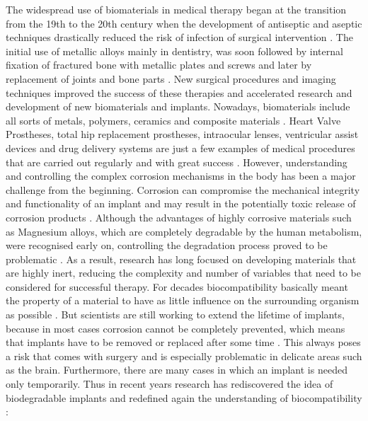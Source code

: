 The widespread use of biomaterials in medical therapy began at the transition from the 19th to the 20th century when the development of antiseptic and aseptic techniques drastically reduced the risk of infection of surgical intervention \supercite{hernigou_history_2017,balamurugan_corrosion_2008,gilbert_medical_2012}. The initial use of metallic alloys mainly in dentistry, was soon followed by internal fixation of fractured bone with metallic plates and screws \supercite{hernigou_history2_2017} and later by replacement of joints and bone parts \supercite{ratner_introduction_1997,fernandez_de_grado_bone_2018}. New surgical procedures and imaging techniques improved the success of these therapies and accelerated research and development of new biomaterials and implants. Nowadays, biomaterials include all sorts of metals, polymers, ceramics and composite materials \supercite{park_biomaterials_2007}. Heart Valve Prostheses, total hip replacement prostheses, intraocular lenses, ventricular assist devices and drug delivery systems are just a few examples of medical procedures that are carried out regularly and with great success \supercite{ratner_introduction_1997,bharadwaj_overview_2021}. However, understanding and controlling the complex corrosion mechanisms in the body has been a major challenge from the beginning. Corrosion can compromise the mechanical integrity and functionality of an implant and may result in the potentially toxic release of corrosion products \supercite{kamachimudali_corrosion_2003,ali_biocompatibility_2020}. Although the advantages of highly corrosive materials such as Magnesium alloys, which are completely degradable by the human metabolism, were recognised early on, controlling the degradation process proved to be problematic \supercite{witte_history_2010}. As a result, research has long focused on developing materials that are highly inert, reducing the complexity and number of variables that need to be considered for successful therapy. For decades biocompatibility basically meant the property of a material to have as little influence on the surrounding organism as possible \supercite{gilbert_medical_2012,jacobs_corrosion_1998}. But scientists are still working to extend the lifetime of implants, because in most cases corrosion cannot be completely prevented, which means that implants have to be removed or replaced after some time \supercite{ali_biocompatibility_2020,tranquillo_surface_2020}. This always poses a risk that comes with surgery and is especially problematic in delicate areas such as the brain. Furthermore, there are many cases in which an implant is needed only temporarily. Thus in recent years research has rediscovered the idea of biodegradable implants and redefined again the understanding of biocompatibility \supercite{ghasemi-mobarakeh_key_2019}: \\
